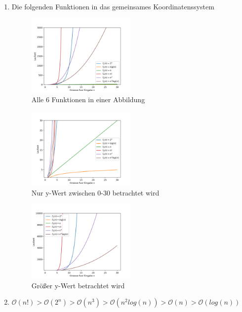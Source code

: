\documentclass[12pt]{scrartcl}
\begin{document}
\begin{enumerate}
  \item Die folgenden Funktionen in das gemeinsames Koordinatenssystem
  \begin{figure}[!h]
    \centering
      \includegraphics[width=0.5\textwidth]{overview.png}
    \caption{Alle 6 Funktionen in einer Abbildung}
  \end{figure}
  \begin{figure}[!h]
    \centering
      \includegraphics[width=0.5\textwidth]{small_y.png}
    \caption{Nur y-Wert zwischen 0-30 betrachtet wird}
  \end{figure}
  \begin{figure}[!h]
    \centering
      \includegraphics[width=0.5\textwidth]{big_y.png}
    \caption{Größer y-Wert betrachtet wird}
  \end{figure}
  \item $\mathcal{O}(n!) > \mathcal{O}(2^n) > \mathcal{O}(n^3) > \mathcal{O}(n^2log(n)) > \mathcal{O}(n) > \mathcal{O}(log(n))$

\end{enumerate}
\end{document}
